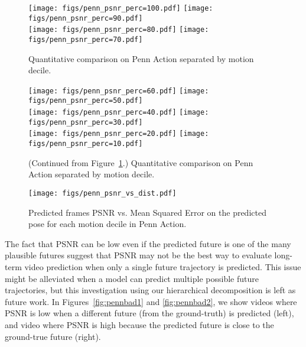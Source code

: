 \documentclass{article}
\begin{document}
\begin{appendix}
\begin{figure}[htb!]
\centering
\vspace{30pt}
\texttt{[image: figs/penn\_psnr\_perc=100.pdf]}
\hspace{.8cm}
\texttt{[image: figs/penn\_psnr\_perc=90.pdf]} \\
\texttt{[image: figs/penn\_psnr\_perc=80.pdf]}
\hspace{.8cm}
\texttt{[image: figs/penn\_psnr\_perc=70.pdf]} \\
\caption{Quantitative comparison on Penn Action separated by motion decile.}
\label{fig:penn_motion1}
\vspace{-2cm}
\end{figure}

\clearpage
\begin{figure}[htb!]
\vspace{30pt}
\centering
\texttt{[image: figs/penn\_psnr\_perc=60.pdf]}
\hspace{.8cm}
\texttt{[image: figs/penn\_psnr\_perc=50.pdf]}\\
\texttt{[image: figs/penn\_psnr\_perc=40.pdf]}
\hspace{.8cm}
\texttt{[image: figs/penn\_psnr\_perc=30.pdf]}\\
\texttt{[image: figs/penn\_psnr\_perc=20.pdf]}
\hspace{.8cm}
\texttt{[image: figs/penn\_psnr\_perc=10.pdf]}
\vspace{-.3cm}
\caption{(Continued from Figure~\ref{fig:penn_motion1}.) Quantitative comparison on Penn Action separated by motion decile.}
\label{fig:penn_motion2}
\end{figure}

\begin{figure}[htb!]
\centering
\texttt{[image: figs/penn\_psnr\_vs\_dist.pdf]}
\vspace{-.3cm}
\caption{Predicted frames PSNR vs. Mean Squared Error on the predicted pose for each motion decile in Penn Action.}
\label{fig:penn_corr}
\end{figure}
The fact that PSNR can be low even if the predicted future is one of the many plausible futures suggest that PSNR may not be the best way to evaluate long-term video prediction when only a single future trajectory is predicted.
This issue might be alleviated when a model can predict multiple possible future trajectories, but this investigation using our hierarchical decomposition is left as future work. 
In Figures~\ref{fig:pennbad1} and \ref{fig:pennbad2}, we show videos where PSNR is low when a different future (from the ground-truth) is predicted (left), and video where PSNR is high because the predicted future is close to the ground-true future (right).


\end{appendix}
\end{document}

